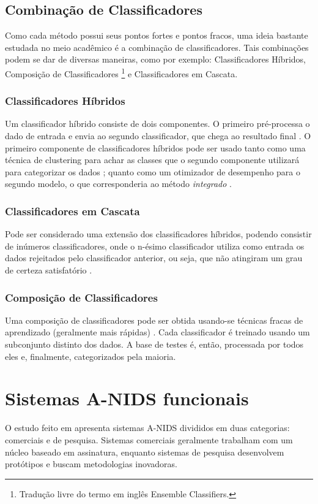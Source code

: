 \section{Combinação de Classificadores}
Como cada método possui seus pontos fortes e pontos fracos, uma ideia bastante estudada no meio acadêmico é a
 combinação de classificadores. Tais combinações podem se dar de diversas maneiras, como por exemplo: Classificadores
 Híbridos, Composição de Classificadores \footnote{Tradução livre do termo em inglês Ensemble Classifiers.} e
 Classificadores em Cascata.

 \subsection{Classificadores Híbridos}
    Um classificador híbrido consiste de dois componentes. O primeiro pré-processa o dado de entrada e envia ao segundo
    classificador, que chega ao resultado final \cite{tsai09}. O primeiro componente de classificadores híbridos pode ser usado tanto
    como uma técnica de clustering para achar as classes que o segundo componente utilizará para categorizar os dados \cite{ni07};
    quanto como um otimizador de desempenho para o segundo modelo, o que corresponderia ao método \textit{integrado}
    \cite{aydin09}.


 \subsection{Classificadores em Cascata}
    Pode ser considerado uma extensão dos classificadores híbridos, podendo consistir de inúmeros classificadores, onde
    o n-ésimo classificador utiliza como entrada os dados rejeitados pelo classificador anterior, ou seja, que não
    atingiram um grau de certeza satisfatório \cite{tsai09}.

 \subsection{Composição de Classificadores}
    Uma composição de classificadores pode ser obtida usando-se técnicas fracas de aprendizado
    (geralmente mais rápidas) \cite{tsai09}. Cada classificador é treinado usando um subconjunto distinto dos dados.
    A base de testes é, então, processada por todos eles e, finalmente, categorizados pela maioria.


\chapter{Sistemas A-NIDS funcionais}
    O estudo feito em \cite{teodoro09} apresenta sistemas A-NIDS divididos em duas categorias: comerciais e de pesquisa.
    Sistemas comerciais geralmente trabalham com um núcleo baseado em assinatura, enquanto sistemas de pesquisa
    desenvolvem protótipos e buscam metodologias inovadoras.

